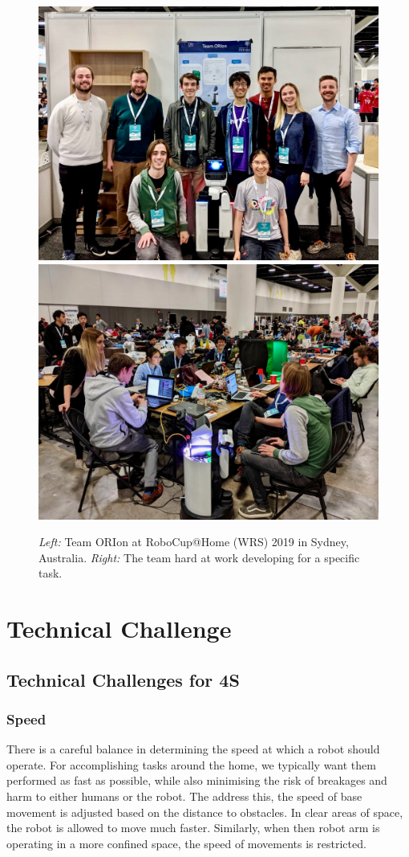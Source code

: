 \documentclass[runningheads,a4paper]{llncs}
\begin{document}
\begin{figure}[tb]
  \begin{center}
    \includegraphics[width=.48\columnwidth, clip, trim=0 0ex 0ex 50ex]{images/robocup_team.jpg}
    \includegraphics[width=.45\columnwidth, clip, trim=0 0ex 0ex 50ex]{images/robocup_team_working.jpg}
  \end{center} 
  \caption{\emph{Left:} Team ORIon at RoboCup@Home (WRS) 2019 in Sydney, Australia. \emph{Right:} The team hard at work developing for a specific task.}
  \label{fig:robocup}
\end{figure}

\section{Technical Challenge}
\subsection{Technical Challenges for 4S}
\subsubsection{Speed}
There is a careful balance in determining the speed at which a robot should operate. For accomplishing tasks around the home, we typically want them performed as fast as possible, while also minimising the risk of breakages and harm to either humans or the robot. The address this, the speed of base movement is adjusted based on the distance to obstacles. In clear areas of space, the robot is allowed to move much faster. Similarly, when then robot arm is operating in a more confined space, the speed of movements is restricted.
\end{document}
